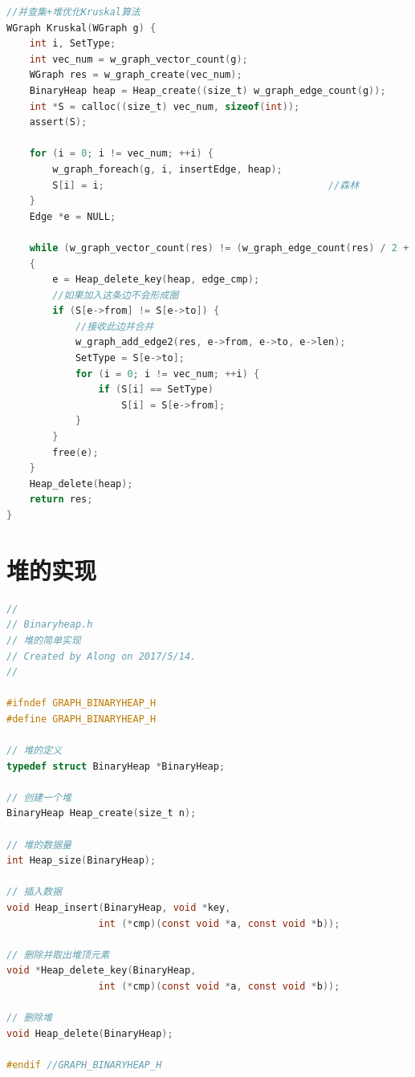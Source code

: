 \documentclass[a4paper,10pt]{ctexart}
\begin{document}
\begin{lstlisting}[language={C}]
//并查集+堆优化Kruskal算法
WGraph Kruskal(WGraph g) {
    int i, SetType;
    int vec_num = w_graph_vector_count(g);
    WGraph res = w_graph_create(vec_num);
    BinaryHeap heap = Heap_create((size_t) w_graph_edge_count(g));
    int *S = calloc((size_t) vec_num, sizeof(int));
    assert(S);

    for (i = 0; i != vec_num; ++i) {
        w_graph_foreach(g, i, insertEdge, heap);
        S[i] = i;                                       //森林
    }
    Edge *e = NULL;

    while (w_graph_vector_count(res) != (w_graph_edge_count(res) / 2 + 1))
    {
        e = Heap_delete_key(heap, edge_cmp);
        //如果加入这条边不会形成圈
        if (S[e->from] != S[e->to]) {
            //接收此边并合并
            w_graph_add_edge2(res, e->from, e->to, e->len);
            SetType = S[e->to];
            for (i = 0; i != vec_num; ++i) {
                if (S[i] == SetType)
                    S[i] = S[e->from];
            }
        }
        free(e);
    }
    Heap_delete(heap);
    return res;
}

\end{lstlisting}

\section{堆的实现}
\begin{lstlisting}[language={C}]
//
// Binaryheap.h
// 堆的简单实现
// Created by Along on 2017/5/14.
//

#ifndef GRAPH_BINARYHEAP_H
#define GRAPH_BINARYHEAP_H

// 堆的定义
typedef struct BinaryHeap *BinaryHeap;

// 创建一个堆
BinaryHeap Heap_create(size_t n);

// 堆的数据量
int Heap_size(BinaryHeap);

// 插入数据
void Heap_insert(BinaryHeap, void *key, 
                int (*cmp)(const void *a, const void *b));

// 删除并取出堆顶元素
void *Heap_delete_key(BinaryHeap, 
                int (*cmp)(const void *a, const void *b));

// 删除堆
void Heap_delete(BinaryHeap);

#endif //GRAPH_BINARYHEAP_H
\end{lstlisting}
\end{document}
